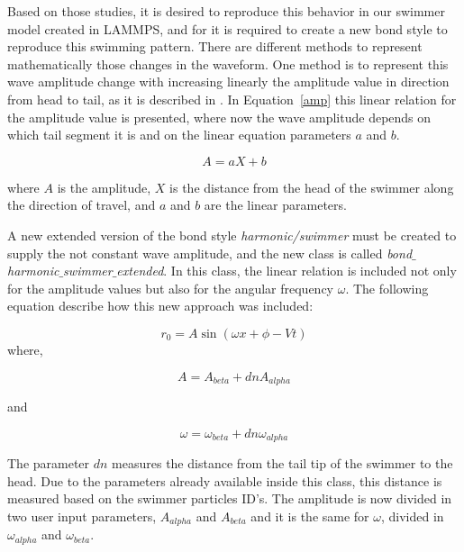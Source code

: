 Based on those studies, it is desired to reproduce this behavior in our swimmer model created in LAMMPS, and for it is required to create a new bond style to reproduce this swimming
pattern. There are different methods to represent mathematically those changes in the waveform. One method is to represent this wave amplitude change with increasing linearly the 
amplitude value in direction from head to tail, as it is described in \cite{jayne_swimming_1985}. In Equation~\ref{amp} this linear relation for the amplitude value is presented,
where now the wave amplitude depends on which tail segment it is and on the linear equation parameters $a$ and $b$.

\begin{equation}\label{amp}
  A = a X + b
\end{equation}

where $A$ is the amplitude, $X$ is the distance from the head of the swimmer along the direction of travel, and $a$ and $b$ are the linear parameters.\par

A new extended version of the bond style \textit{harmonic/swimmer} must be created to supply the not constant wave amplitude, and the new class is called
\textit{bond$\_$harmonic$\_$swimmer$\_$extended}. In this class, the linear relation is included not only for the amplitude values but also for the angular frequency $\omega$.
The following equation describe how this new approach was included:

\begin{equation}
 r_{0} = A  \sin (\omega x + \phi - Vt)
\end{equation}
 where,
 
\begin{equation}
 A = A_{beta} + dn A_{alpha}
\end{equation}

and
 
\begin{equation}
 \omega = \omega_{beta} + dn \omega_{alpha}
\end{equation}

The parameter $dn$ measures the distance from the tail tip of the swimmer to the head. Due to the parameters already available inside this class, this distance is measured based
on the swimmer particles ID's. The amplitude is now divided in two user input parameters, $A_{alpha}$ and $A_{beta}$ and it is the same for $\omega$, divided in $\omega_{alpha}$
and $\omega_{beta}$.\par


